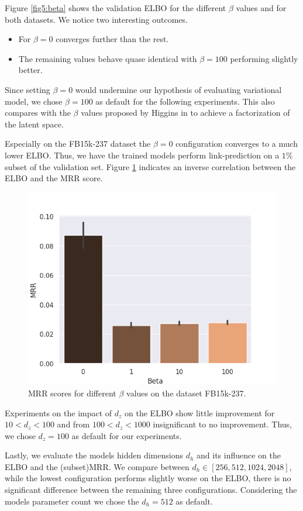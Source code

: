 Figure \ref{fig5:beta} shows the validation ELBO for the different $\beta$ values and for both datasets. We notice two interesting outcomes.  

\begin{itemize}
    \item For $\beta = 0$ converges further than the rest.
    \item The remaining values behave quase identical with $\beta = 100$ performing slightly better. 
\end{itemize}

Since setting $\beta = 0$ would undermine our hypothesis of evaluating variational model, we chose $\beta = 100$ as default for the following experiments. This also compares with the $\beta$ values proposed by Higgins in \cite{higgins_beta-vae_2016} to achieve a factorization of the latent space.

Especially on the FB15k-237 dataset the $\beta = 0$ configuration converges to a much lower ELBO. Thus, we have the trained models perform link-prediction on a $1\%$ subset of the validation set. Figure \ref{fig5:betafbmrr} indicates an inverse correlation between the ELBO and the MRR score. 

\begin{figure}[H]
    \centering
      \includegraphics[width=.45\textwidth]{graphs/plots/beta_mrr_fb.png}
      \caption{MRR scores for different $\beta$ values on the dataset FB15k-237.}
      \label{fig5:betafbmrr}
\end{figure}


Experiments on the impact of $d_z$ on the ELBO show little improvement for $10<d_z<100$ and from $100<d_z<1000$ insignificant to no improvement. Thus, we chose $d_z=100$ as default for our experiments.


Lastly, we evaluate the models hidden dimensions $d_h$ and its influence on the ELBO and the (subset)MRR. We compare between $d_h\in [256, 512, 1024, 2048]$, while the lowest configuration performs slightly worse on the ELBO, there is no significant difference between the remaining three configurations. Considering the models parameter count we chose the $d_h=512$ as default.


